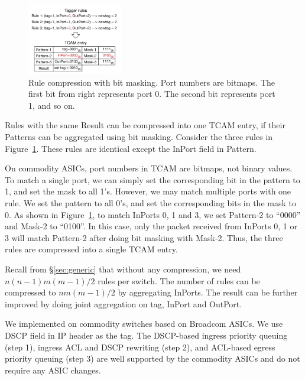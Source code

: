 \begin{figure}
	 
	\centering
	\includegraphics[width=0.37\textwidth] {figs/compression_with_bitmasking}
	\vspace{-1em}
	\caption{Rule compression with bit masking. Port numbers are bitmaps.
	The first bit from right represents port 0. The second bit represents port 1, and so on. }\label{fig:compression}
    \vspace{-1.5em}	
\end{figure}

Rules with the same Result can be compressed into one TCAM entry, if their
Patterns can be aggregated using bit masking. Consider the three
rules in Figure~\ref{fig:compression}. These rules are identical except the InPort
field in Pattern.

On commodity ASICs, port numbers in TCAM are bitmaps, not binary values. To match a single 
port, we can simply set the corresponding bit in the pattern to 1, and set the mask to all 1's. 
However, we may match multiple ports with one rule. We set the pattern to 
all 0's, and set the corresponding bits in the mask to 0. As shown in Figure~\ref{fig:compression},  
to match InPorts 0, 1 and 3, we set Pattern-2 to ``0000''  and Mask-2 to ``0100''. In this case, 
only the packet received from InPorts 0, 1 or 3 will match Pattern-2 after doing bit masking with Mask-2. 
Thus, the three rules are compressed into a single TCAM entry.

Recall from \S\ref{sec:generic} that without any compression, we need
$n(n-1)m(m-1)/2$ rules per switch. The number of rules can be
compressed to $nm(m-1)/2$ by aggregating InPorts.  The
result can be further improved by doing joint aggregation on tag, InPort and
OutPort.

 We implemented \sysname{} on commodity
switches based on Broadcom ASICs.  We use DSCP field in IP header as the tag.
The DSCP-based ingress priority queuing (step 1), ingress ACL and DSCP rewriting (step 2),
and ACL-based egress priority queuing (step 3) are well supported by the
commodity ASICs and do not require any ASIC changes. 


